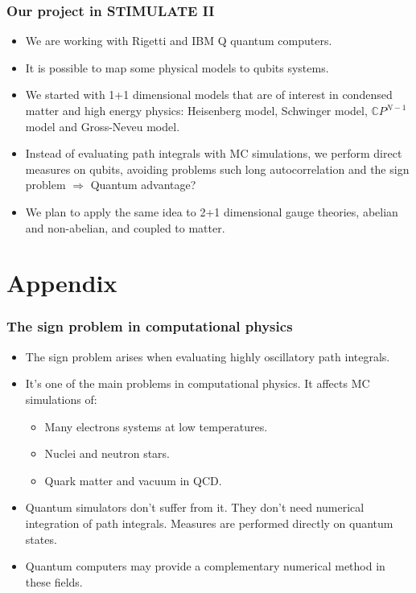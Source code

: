 \documentclass[11pt,t,xcolor=dvipsnames,aspectratio=169]{beamer}
\newlength\leftsidebar
\begin{document}
\begin{frame}
    \frametitle{Our project in STIMULATE II}
    \begin{itemize}
        \item
            We are working with Rigetti and IBM Q quantum computers.
        \item
            It is possible to map some physical models to qubits systems.
        \item
            We started with 1+1 dimensional models that are of interest in condensed matter and high energy physics:
            Heisenberg model, Schwinger model, $\mathbb CP^{N-1}$ model and Gross-Neveu model.
        \item
            Instead of evaluating path integrals with MC simulations,
            we perform direct measures on qubits, avoiding problems such long autocorrelation and the sign problem
            $\Rightarrow$ Quantum advantage?
        \item
            We plan to apply the same idea to 2+1 dimensional gauge theories, abelian and non-abelian, and coupled to matter.
    \end{itemize}
\end{frame}


\leftsidebar
\begin{frame}[plain,t]
\titlepage
\end{frame}
\hoffset=0in %

\section{Appendix}

\begin{frame}
    \frametitle{The sign problem in computational physics}
    \begin{itemize}
        \item
            The sign problem arises when evaluating highly oscillatory path integrals.
        \item
            It's one of the main problems in computational physics.
            It affects MC simulations of:
            \begin{itemize}
                \item Many electrons systems at low temperatures.
                \item Nuclei and neutron stars.
                \item Quark matter and vacuum in QCD.
            \end{itemize}
        \item
            Quantum simulators don't suffer from it.
            They don't need numerical integration of path integrals.
            Measures are performed directly on quantum states.
        \item
            Quantum computers may provide a complementary numerical method in these fields.
    \end{itemize}
\end{frame}
\end{document}
